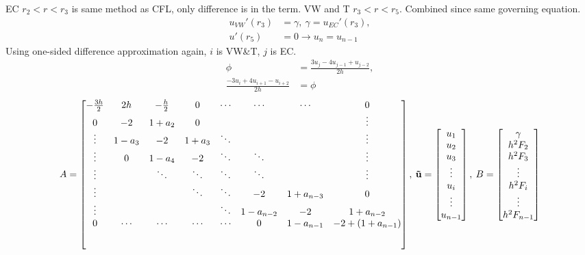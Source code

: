 \documentclass[8pt, a4paper]{article}
\begin{document}
  EC $r_2<r<r_3$ is same method as CFL, only difference is in the \RNO term.
  \newpage
  VW and T $r_3<r<r_5$. Combined since same governing equation.
    \begin{align*}
    u_{VW}'(r_3)&=\gamma,\:\gamma=u_{EC}'(r_3),\\    
    u'(r_5)&=0\rightarrow u_n=u_{n-1}
    \end{align*}
  Using one-sided difference approximation again, $i$ is VW\&T, $j$ is EC.
  \begin{align*}
  \phi&=\frac{3u_j-4u_{j-1}+u_{j-2}}{2h},\\
  \frac{-3u_i+4u_{i+1}-u_{i+2}}{2h}&=\phi
  \end{align*}
  \begin{equation}
  A=
  \begin{bmatrix}
  -\frac{3h}{2} & 2h & -\frac{h}{2} & 0 & \cdots & \cdots & \cdots & 0\\
  0 & -2 & 1+a_2 & 0 & & & & \vdots\\
  \vdots & 1-a_3 & -2 & 1+a_3 & \ddots & & & \vdots\\
  \vdots & 0 & 1-a_4 & -2 & \ddots & \ddots & & \vdots\\
  \vdots & & \ddots & \ddots & \ddots & \ddots & & \vdots\\
  \vdots & & & \ddots & \ddots & -2 & 1+a_{n-3} & 0 \\
  \vdots & & & & \ddots & 1-a_{n-2} & -2 & 1+a_{n-2} \\
  0 & \cdots & \cdots & \cdots & \cdots & 0 & 1-a_{n-1} & -2+(1+a_{n-1}) \\[5ex]
  \end{bmatrix},\:
  \mathbf{\vec{u}}=
  \begin{bmatrix}
  u_1\\
  u_2\\
  u_3\\
  \vdots\\
  u_i\\
  \vdots\\
  u_{n-1}
  \end{bmatrix},\:
  B=
  \begin{bmatrix}
  \gamma\\
  h^2F_2\\
  h^2F_3\\
  \vdots\\
  h^2F_i\\
  \vdots\\
  h^2F_{n-1}
  \end{bmatrix}
  \end{equation}
\end{document}
